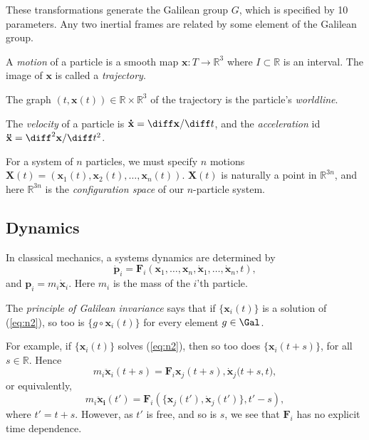 \documentclass[12pt]{article}
\begin{document}
These transformations generate the Galilean group $G$, which is specified by 10 parameters. Any two inertial frames are related by some element of the Galilean group.

A \emph{motion} of a particle is a smooth map $\mathbf{x} : T \to \mathbb{R}^3$ where $I \subset \mathbb{R}$ is an interval. The image of $\mathbf{x}$ is called a \emph{trajectory}.

The graph $(t, \mathbf{x}(t)) \in \mathbb{R} \times \mathbb{R}^3$ of the trajectory is the particle's \emph{worldline}.

The \emph{velocity} of a particle is $\mathbf{\dot x} = \diff \mathbf{x} / \diff t$, and the \emph{acceleration} id $\mathbf{\ddot x} = \diff^2 \mathbf{x}/\diff t^2$.

For a system of $n$ particles, we must specify $n$ motions $\mathbf{X}(t) = (\mathbf{x}_1(t), \mathbf{x}_2(t), \ldots, \mathbf{x}_n(t))$. $\mathbf{X}(t)$ is naturally a point in $\mathbb{R}^{3n}$, and here $\mathbb{R}^{3n}$ is the \emph{configuration space} of our $n$-particle system.


\subsection{Dynamics}
\label{sub:dynamix}

In classical mechanics, a systems dynamics are determined by
\[
	\mathbf{\dot p}_i = \mathbf{F}_i (\mathbf{x}_1, \ldots, \mathbf{x}_n, \mathbf{\dot x}_1, \ldots, \mathbf{\dot x}_n, t), \tag{N2}\label{eq:n2}
\]
and $\mathbf{p}_i = m_i \mathbf{\dot x}_i$. Here $m_i$ is the mass of the $i$'th particle.

The \emph{principle of Galilean invariance} says that if $\{\mathbf{x}_i (t)\}$ is a solution of (\ref{eq:n2}), so too is $\{g \circ \mathbf{x}_i(t)\}$ for every element $g \in \Gal$.

For example, if $\{\mathbf{x}_i(t)\}$ solves (\ref{eq:n2}), then so too does $\{\mathbf{x}_i(t+s)\}$, for all $s \in \mathbb{R}$. Hence
\[
	m_i \mathbf{\ddot x}_i(t+s) = \mathbf{F}_i{\mathbf{x}_j(t+s), \mathbf{\dot x}_j(t+s}, t),
\]
or equivalently,
\[
	m_i \mathbf{\ddot x_i}(t') = \mathbf{F}_i(\{\mathbf{x}_j(t'), \mathbf{\dot x}_j(t')\}, t' - s),
\]
where $t' = t + s$. However, as $t'$ is free, and so is $s$, we see that $\mathbf{F}_i$ has no explicit time dependence.
\end{document}
